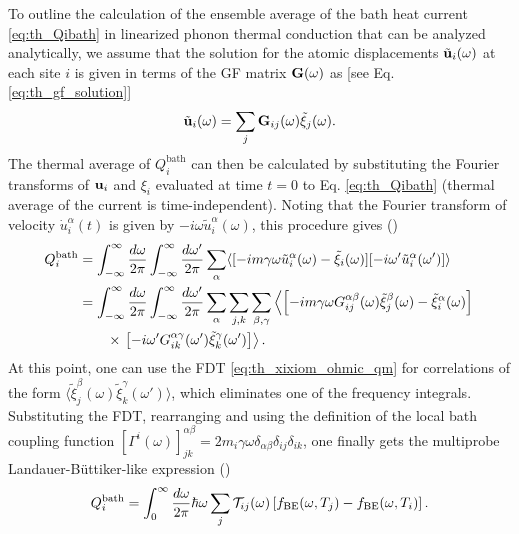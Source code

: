 To outline the calculation of the ensemble average of the bath heat current \eqref{eq:th_Qibath} in linearized phonon thermal conduction that can be analyzed analytically, we assume that the solution for the atomic displacements $\tilde{\mathbf{u}}_i(\omega)$ at each site $i$ is given in terms of the GF matrix $\mathbf{G}(\omega)$ as [see Eq. \eqref{eq:th_gf_solution}]
\begin{equation}
 \tilde{\mathbf{u}}_i(\omega) = \sum_{j} \mathbf{G}_{ij}(\omega) \tilde{\xi}_j(\omega).
\end{equation}
The thermal average of $Q_i^{\textrm{bath}}$ can then be calculated by substituting the Fourier transforms of $\mathbf{u}_i$ and $\xi_i$ evaluated at time $t=0$ to Eq. \eqref{eq:th_Qibath} (thermal average of the current is time-independent). Noting that the Fourier transform of velocity $\dot{u}_i^{\alpha}(t)$ is given by $-i\omega \tilde{u}^{\alpha}_i(\omega)$, this procedure gives ()
\begin{alignat}{2}
 Q_i^{\textrm{bath}}  &= \int_{-\infty}^{\infty} \frac{d\omega}{2\pi} \int_{-\infty}^{\infty} \frac{d\omega'}{2\pi} \sum_{\alpha} \langle  [ -im\gamma\omega \tilde u_i^{\alpha}(\omega)-\tilde \xi_i(\omega)][-i\omega' \tilde u_i^{\alpha}(\omega')] \rangle \\
  &= \int_{-\infty}^{\infty} \frac{d\omega}{2\pi} \int_{-\infty}^{\infty} \frac{d\omega'}{2\pi} \sum_{\alpha} \sum_{j,k} \sum_{\beta,\gamma} \left\langle \left[ -im\gamma\omega G_{ij}^{\alpha\beta}(\omega)\tilde \xi_j^{\beta}(\omega)-\tilde \xi_i^{\alpha}(\omega) \right] \right. \notag \\
  &\qquad \times \left.\left[-i\omega' G_{ik}^{\alpha\gamma}(\omega') \tilde \xi_k^{\gamma}(\omega') \right]  \right\rangle .
\end{alignat}
At this point, one can use the FDT \eqref{eq:th_xixiom_ohmic_qm} for correlations of the form $\langle \tilde \xi_j^{\beta}(\omega)\tilde \xi_k^{\gamma}(\omega') \rangle$, which eliminates one of the frequency integrals. Substituting the FDT, rearranging and using the definition of the local bath coupling function $[\Gamma^i(\omega)]_{jk}^{\alpha\beta}=2m_i\gamma\omega \delta_{\alpha\beta}\delta_{ij} \delta_{ik}$, one finally gets the multiprobe Landauer-B\"uttiker-like \cite{landauer57,buttiker92} expression ()
\begin{equation}
  Q_i^{\textrm{bath}} = \int_0^{\infty} \frac{d\omega}{2\pi} \hbar \omega  \sum_j \mathcal{T}_{ij}(\omega) \left[ f_{\textrm{BE}}(\omega,T_j)- f_{\textrm{BE}}(\omega,T_i)\right]. \label{eq:th_QI}
\end{equation}

